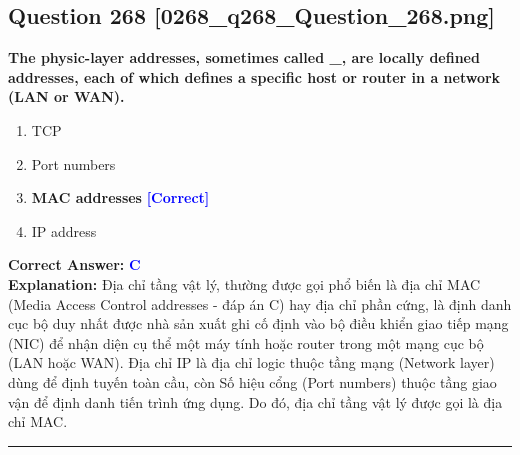 \documentclass[11pt,a4paper]{article}
\begin{document}
\begin{minipage}{\textwidth}
\subsection*{Question 268 \quad \footnotesize{[0268\_q268\_Question\_268.png]}}
\noindent \textbf{The physic-layer addresses, sometimes called \_, are locally defined addresses, each of which defines a specific host or router in a network (LAN or WAN).}

\begin{enumerate}[label=\Alph*.]
    \item TCP
    \item Port numbers
    \item \textbf{MAC addresses} \hfill \textcolor{blue}{\textbf{[Correct]}}
    \item IP address
\end{enumerate}

\noindent \textbf{Correct Answer:} \textcolor{blue}{\textbf{C}} \\[2pt]
\noindent \textbf{Explanation:} Địa chỉ tầng vật lý, thường được gọi phổ biến là địa chỉ MAC (Media Access Control addresses - đáp án C) hay địa chỉ phần cứng, là định danh cục bộ duy nhất được nhà sản xuất ghi cố định vào bộ điều khiển giao tiếp mạng (NIC) để nhận diện cụ thể một máy tính hoặc router trong một mạng cục bộ (LAN hoặc WAN). Địa chỉ IP là địa chỉ logic thuộc tầng mạng (Network layer) dùng để định tuyến toàn cầu, còn Số hiệu cổng (Port numbers) thuộc tầng giao vận để định danh tiến trình ứng dụng. Do đó, địa chỉ tầng vật lý được gọi là địa chỉ MAC.

\par\vspace{0.3cm}
\hrule
\vspace{0.3cm}
\end{minipage}
\end{document}
